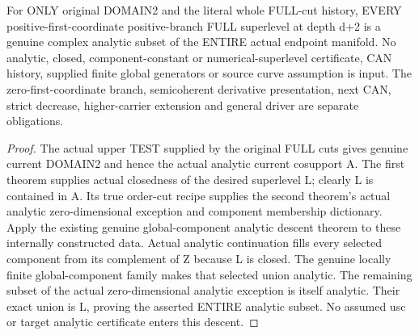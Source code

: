 \begin{theorem}
\label{hir:original-full-cut-positive-global-superlevels-analytic}
\leanok
For ONLY original DOMAIN2 and the literal whole FULL-cut history, EVERY
positive-first-coordinate positive-branch FULL superlevel at depth d+2 is a
genuine complex analytic subset of the ENTIRE actual endpoint manifold.
No analytic, closed, component-constant or numerical-superlevel certificate,
CAN history, supplied finite global generators or source curve assumption is
input. The zero-first-coordinate branch, semicoherent derivative presentation,
next CAN, strict decrease, higher-carrier extension and general driver are
separate obligations.
\end{theorem}
\begin{proof}
The actual upper TEST supplied by the original FULL cuts gives genuine
current DOMAIN2 and hence the actual analytic current cosupport A. The first
theorem supplies actual closedness of the desired superlevel L; clearly
L is contained in A. Its true order-cut recipe supplies the second theorem's
actual analytic zero-dimensional exception and component membership dictionary.
Apply the existing genuine global-component analytic descent theorem to these
internally constructed data. Actual analytic continuation fills every selected
component from its complement of Z because L is closed. The genuine locally
finite global-component family makes that selected union analytic. The
remaining subset of the actual zero-dimensional analytic exception is itself
analytic. Their exact union is L, proving the asserted ENTIRE analytic subset.
No assumed usc or target analytic certificate enters this descent.
\end{proof}
